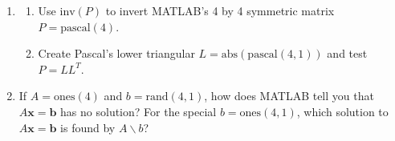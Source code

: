 \documentclass[14pt, a4paper]{article}
\begin{document}
\begin{enumerate}[resume]
    \item
          \begin{enumerate}
              \item Use $\text{inv}(P)$ to invert \textcolor{blue!60!white}{MATLAB}'s 4 by 4 symmetric matrix $P = \text{pascal}(4)$.
              \item Create Pascal's lower triangular $L = \text{abs}(\text{pascal}(4,1))$ and test $P = LL^T$.
          \end{enumerate}

    \item If $A = \text{ones}(4)$ and $b = \text{rand}(4,1)$, how does \textcolor{blue!60!white}{MATLAB} tell you that $A\boldsymbol{x} = \boldsymbol{b}$ has no solution? For the special $b = \text{ones}(4,1)$, which solution to $A\boldsymbol{x} = \boldsymbol{b}$ is found by $A\backslash b$?
\end{enumerate}
\end{document}
